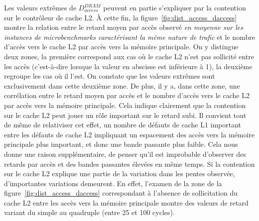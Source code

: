 Les valeurs extrêmes de $D_{access}^{DRAM}$ peuvent en partie s'expliquer par la contention sur le contrôleur de cache L2.
À cette fin, la figure~\ref{fig:dist_access_daccess} montre la relation entre le retard moyen par accès observé \emph{en moyenne sur les instances de microbenchmarks caractérisant la même nature de trafic} et le nombre d'accès vers le cache L2 par accès vers la mémoire principale.
On y distingue deux zones, la première correspond aux cas où le cache L2 n'est pas sollicité entre les accès (c'est-à-dire lorsque la valeur en abscisse est inférieure à 1), la deuxième regroupe les cas où il l'est.
On constate que les valeurs extrêmes sont exclusivement dans cette deuxième zone.
De plus, il y a, dans cette zone, une corrélation entre le retard moyen par accès et le nombre d'accès vers le cache L2 par accès vers la mémoire principale.
Cela indique clairement que la contention sur le cache L2 peut jouer un rôle important sur le retard subi.
Il convient tout de même de relativiser cet effet, un nombre de défauts de cache L1 important entre les défauts de cache L2 impliquant un espacement des accès vers la mémoire principale plus important, et donc une bande passante plus faible.
Cela nous donne une raison supplémentaire, de penser qu'il est improbable d'observer des retards par accès et des bandes passantes élevées en même temps.
Si la contention sur le cache L2 explique une partie de la variation dans les pentes observée, d'importantes variations demeurent.
En effet, l'examen de la zone de la figure~\ref{fig:dist_access_daccess} correspondant à l'absence de sollicitation du cache L2 entre les accès vers la mémoire principale montre des valeurs de retard variant du simple au quadruple (entre 25 et 100 cycles).



